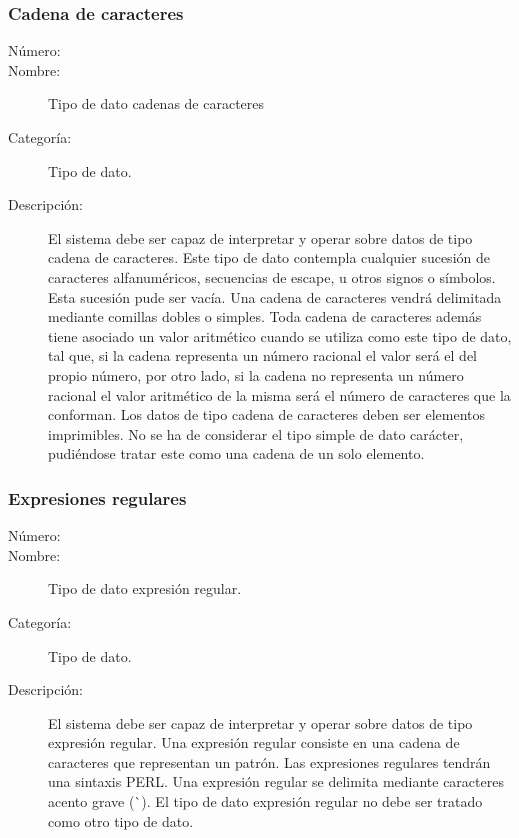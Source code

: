\subsubsection{Cadena de caracteres}
\begin{framed}
	\begin{description}
		\item [Número:] \cn
		\item [Nombre:] Tipo de dato cadenas de caracteres
		\item [Categoría:] Tipo de dato.
		\item [Descripción:] El sistema debe ser capaz de interpretar y operar sobre datos de tipo cadena de caracteres. Este tipo
		de dato contempla cualquier sucesión de caracteres alfanuméricos, secuencias de escape, u otros signos o símbolos. Esta sucesión pude
		ser vacía. Una cadena de caracteres vendrá delimitada mediante comillas dobles o simples. Toda cadena de caracteres además tiene asociado
		un valor aritmético cuando se utiliza como este tipo de dato, tal que, si la cadena representa un número racional el valor será el del
		propio número, por otro lado, si la cadena
		no representa un número racional el valor aritmético de la misma será el número de caracteres que la conforman. Los datos de tipo cadena
		de caracteres deben ser elementos imprimibles. No se ha de considerar el tipo simple de dato carácter, pudiéndose tratar este como una cadena
		de un solo elemento.
	\end {description}
\end{framed}

\subsubsection{Expresiones regulares}
\begin{framed}
	\begin{description}
		\item [Número:] \cn
		\item [Nombre:] Tipo de dato expresión regular.
		\item [Categoría:] Tipo de dato.
		\item [Descripción:] El sistema debe ser capaz de interpretar y operar sobre datos de tipo expresión regular. Una expresión regular
		consiste en una cadena de caracteres que representan un patrón. Las expresiones regulares tendrán una sintaxis PERL. Una expresión regular
		se delimita mediante caracteres acento grave (\`\ ). El tipo de dato expresión regular no debe ser tratado como otro tipo de dato.
	\end {description}
\end{framed}

